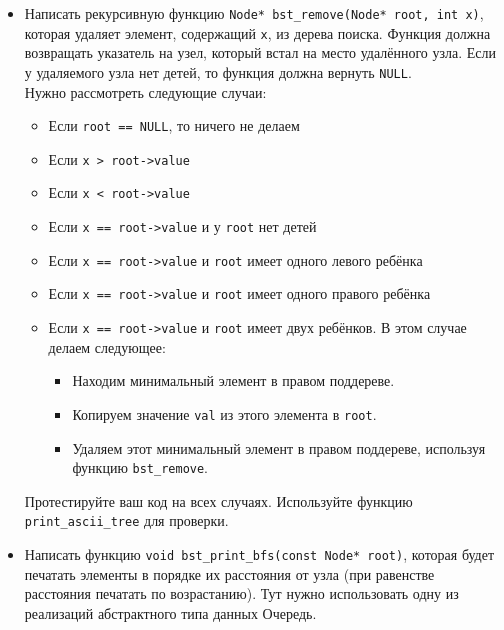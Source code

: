 \documentclass{article}
\begin{document}
\begin{itemize}
\item Написать рекурсивную функцию \texttt{Node* bst\_remove(Node* root, int x)}, которая удаляет элемент, содержащий \texttt{x}, из дерева поиска. Функция должна возвращать указатель на узел, который встал на место удалённого узла. Если у удаляемого узла нет детей, то функция должна вернуть \texttt{NULL}.\\
Нужно рассмотреть следующие случаи:
\begin{itemize}
\item Если \texttt{root == NULL}, то ничего не делаем
\item Если \texttt{x > root->value}
\item Если \texttt{x < root->value}
\item Если \texttt{x == root->value} и у \texttt{root} нет детей
\item Если \texttt{x == root->value} и \texttt{root} имеет одного левого ребёнка
\item Если \texttt{x == root->value} и \texttt{root} имеет одного правого ребёнка
\item Если \texttt{x == root->value} и \texttt{root} имеет двух ребёнков. В этом случае делаем следующее:
	\begin{itemize}
	\item Находим минимальный элемент в правом поддереве.
	\item Копируем значение \texttt{val} из этого элемента в \texttt{root}.
	\item Удаляем этот минимальный элемент в правом поддереве, используя функцию \texttt{bst\_remove}.
	\end{itemize}
\end{itemize}
Протестируйте ваш код на всех случаях. Используйте функцию \texttt{print\_ascii\_tree} для проверки.



\item Написать функцию \texttt{void bst\_print\_bfs(const Node* root)}, которая будет печатать элементы в порядке их расстояния от узла (при равенстве расстояния печатать по возрастанию). Тут нужно использовать одну из реализаций абстрактного типа данных Очередь.
\end{itemize}
\newpage
\end{document}
